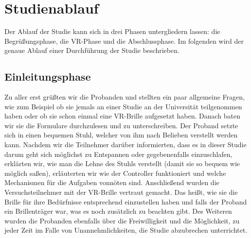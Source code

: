 \section{Studienablauf}

Der Ablauf der Studie kann sich in drei Phasen untergliedern lassen: die Begrüßungsphase, die VR-Phase und die Abschlussphase. Im folgenden wird der genaue Ablauf einer Durchführung der Studie beschrieben.

\subsection{Einleitungsphase}
Zu aller erst grüßten wir die Probanden und stellten ein paar allgemeine Fragen, wie zum Beispiel ob sie jemals an einer Studie an der Universität teilgenommen haben oder ob sie schon einmal eine VR-Brille aufgesetzt haben. Danach baten wir sie die Formulare durchzulesen und zu unterschreiben. Der Proband setzte sich in einen bequemen Stuhl, welcher von ihm nach Belieben verstellt werden kann. Nachdem wir die Teilnehmer darüber informierten, dass es in dieser Studie darum geht sich möglichst zu Entspannen oder gegebenenfalls einzuschlafen, erklärten wir, wie man die Lehne des Stuhls verstellt (damit sie so bequem wie möglich saßen), erläuterten wir wie der Controller funktioniert und welche Mechanismen für die Aufgaben vonnöten sind. Anschließend wurden die Versuchsteilnehmer mit der VR-Brille vertraut gemacht. Das heißt, wie sie die Brille für ihre Bedürfnisse entsprechend einzustellen haben und falls der Proband ein Brillenträger war, was es noch zusätzlich zu beachten gibt.
Des Weiteren wurden die Probanden ebenfalls über die Freiwilligkeit und die Möglichkeit, zu jeder Zeit im Falle von Unannehmlichkeiten, die Studie abzubrechen unterrichtet.

